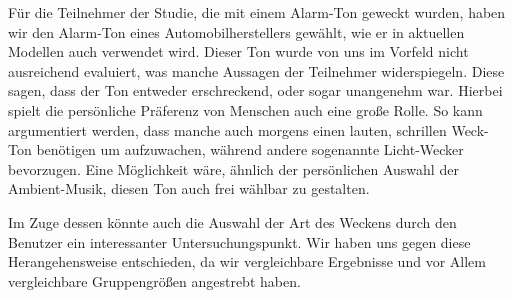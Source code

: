 

Für die Teilnehmer der Studie, die mit einem Alarm-Ton geweckt wurden, haben wir den Alarm-Ton eines Automobilherstellers gewählt, wie er in aktuellen Modellen auch verwendet wird.
Dieser Ton wurde von uns im Vorfeld nicht ausreichend evaluiert, was manche Aussagen der Teilnehmer widerspiegeln.
Diese sagen, dass der Ton entweder erschreckend, oder sogar unangenehm war.
Hierbei spielt die persönliche Präferenz von Menschen auch eine große Rolle. So kann argumentiert werden, dass manche auch morgens einen lauten, schrillen Weck-Ton benötigen um aufzuwachen, während andere sogenannte Licht-Wecker bevorzugen. Eine Möglichkeit wäre, ähnlich der persönlichen Auswahl der Ambient-Musik, diesen Ton auch frei wählbar zu gestalten. 

Im Zuge dessen könnte auch die Auswahl der Art des Weckens durch den Benutzer ein interessanter Untersuchungspunkt. Wir haben uns gegen diese Herangehensweise entschieden, da wir vergleichbare Ergebnisse und vor Allem vergleichbare Gruppengrößen angestrebt haben.
